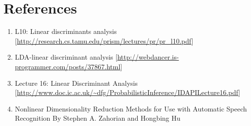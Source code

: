 \documentclass[a4paper]{article}
\begin{document}
\section{References}
\begin{enumerate}
\item L10: Linear discriminants analysis [\url{http://research.cs.tamu.edu/prism/lectures/pr/pr\_l10.pdf}] 

\item LDA-linear discriminant analysis [\url{http://webdancer.is-programmer.com/posts/37867.html}]

\item Lecture 16: Linear Discriminant Analysis [\url{http://www.doc.ic.ac.uk/\~dfg/ProbabilisticInference/IDAPILecture16.pdf}]

\item Nonlinear Dimensionality Reduction Methods for Use with Automatic Speech Recognition By Stephen A. Zahorian and Hongbing Hu
\end{enumerate}
\end{document}
